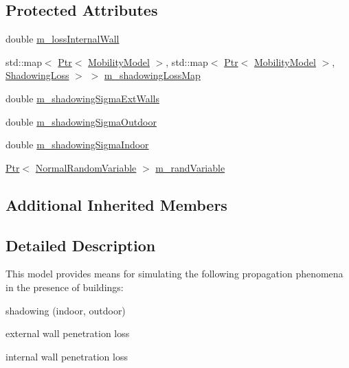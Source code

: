 \subsection*{Protected Attributes}
\begin{DoxyCompactItemize}
\item 
double \hyperlink{classns3_1_1BuildingsPropagationLossModel_add1b3e641ff9ad224cfdbb4d3a3db152}{m\+\_\+loss\+Internal\+Wall}
\item 
std\+::map$<$ \hyperlink{classns3_1_1Ptr}{Ptr}$<$ \hyperlink{classns3_1_1MobilityModel}{Mobility\+Model} $>$, std\+::map$<$ \hyperlink{classns3_1_1Ptr}{Ptr}$<$ \hyperlink{classns3_1_1MobilityModel}{Mobility\+Model} $>$, \hyperlink{classns3_1_1BuildingsPropagationLossModel_1_1ShadowingLoss}{Shadowing\+Loss} $>$ $>$ \hyperlink{classns3_1_1BuildingsPropagationLossModel_a1f4f47c67f9ad77df6808d82b1277dc9}{m\+\_\+shadowing\+Loss\+Map}
\item 
double \hyperlink{classns3_1_1BuildingsPropagationLossModel_a700799f95eeb988ac87beb44b49e65ee}{m\+\_\+shadowing\+Sigma\+Ext\+Walls}
\item 
double \hyperlink{classns3_1_1BuildingsPropagationLossModel_a60ae8ad7436c00d12e31f9ab1a4a3013}{m\+\_\+shadowing\+Sigma\+Outdoor}
\item 
double \hyperlink{classns3_1_1BuildingsPropagationLossModel_a718e03b71e7e7fd97ae7cf16616fbe33}{m\+\_\+shadowing\+Sigma\+Indoor}
\item 
\hyperlink{classns3_1_1Ptr}{Ptr}$<$ \hyperlink{classns3_1_1NormalRandomVariable}{Normal\+Random\+Variable} $>$ \hyperlink{classns3_1_1BuildingsPropagationLossModel_ae3c9b1fdf792660412496302a44661ec}{m\+\_\+rand\+Variable}
\end{DoxyCompactItemize}
\subsection*{Additional Inherited Members}


\subsection{Detailed Description}
This model provides means for simulating the following propagation phenomena in the presence of buildings\+:


\begin{DoxyItemize}
\item shadowing (indoor, outdoor)
\item external wall penetration loss
\item internal wall penetration loss
\end{DoxyItemize}

